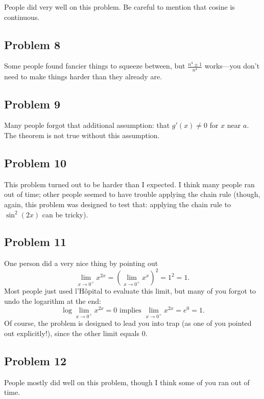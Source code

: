 \documentclass[12pt]{article}
\begin{document}
People did very well on this problem.  Be careful to mention that cosine is continuous.

\subsection*{Problem 8}

Some people found fancier things to squeeze between, but
$\displaystyle\frac{n^4 \pm 1}{n^4}$ works---you don't need to make
things harder than they already are.

\subsection*{Problem 9}

Many people forgot that additional assumption: that $g'(x) \neq 0$ for
$x$ near $a$.  The theorem is not true without this assumption.

\subsection*{Problem 10}

This problem turned out to be harder than I expected.  I think many
people ran out of time; other people seemed to have trouble applying
the chain rule (though, again, this problem was designed to test that:
applying the chain rule to $\sin^2 (2x)$ can be tricky).

\subsection*{Problem 11}

One person did a very nice thing by pointing out
$$
\lim_{x \to 0^{+}} x^{2x} = \left(\lim_{x \to 0^{+}} x^{x}\right)^2 = 1^2 = 1.
$$
Most people just used l'H\^opital to evaluate this limit, but many of you forgot to undo the logarithm at the end:
$$
\log \lim_{x \to 0^{+}} x^{2x} = 0 \mbox{ implies } \lim_{x \to 0^{+}} x^{2x} = e^0 = 1.
$$
Of course, the problem is designed to lead you into trap (as one of
you pointed out explicitly!), since the other limit equals $0$.

\subsection*{Problem 12}

People mostly did well on this problem, though I think some of you ran out of time.

\Large
\end{document}
